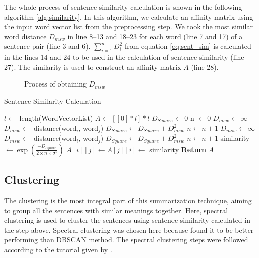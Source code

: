The whole process of sentence similarity calculation is shown in the following algorithm \ref{alg:similarity}. In this algorithm, we calculate an affinity matrix using the input word vector list from the preprocessing step. We took the most similar word distance $D_{msw}$ in line 8--13 and 18--23 for each word (line 7 and 17) of a sentence pair (line 3 and 6). $\sum^n_{i=1}D_i^2$ from equation \ref{eq:sent_sim} is calculated in the lines 14 and 24 to be used in the calculation of sentence similarity (line 27). The similarity is used to construct an affinity matrix $A$ (line 28).
\begin{figure}
    \centering
    
    \caption{Process of obtaining $D_{msw}$}
    \label{fig:msd}
\end{figure}
\begin{algorithm} \caption{Sentence Similarity Calculation} \label{alg:similarity}
\begin{algorithmic}[1]
    \State $l \gets$ length(WordVectorList)
    \State $A \gets [ [ 0 ] * l ] * l$
        \State $D_{Square} \gets 0$
        \State n $\gets 0$
                \State $D_{msw} \gets \infty$
                        \State $D_{msw} \gets$ distance(word$_i$, word$_j$)
                    \EndIf
                \EndFor
                \State $D_{Square} \gets D_{Square} + D_{msw}^2$
                \State $n \gets n+1$ 
            \EndFor
                \State $D_{msw} \gets \infty$
                        \State $D_{msw} \gets$ distance(word$_i$, word$_j$)
                    \EndIf
                \EndFor
                \State $D_{Square} \gets D_{Square} + D_{msw}^2$
                \State $n \gets n+1$
            \EndFor
            \State similarity $\gets \exp \left( \frac{- D_{Square}}{2 \times n \times \sigma^2} \right)$
            \State $A[i][j] \gets A[j][i] \gets$ similarity
        \EndFor
    \EndFor
    \State \textbf{Return} $A$
\end{algorithmic}
\end{algorithm}

\subsection{Clustering}\label{subsec:clustering}
The clustering is the most integral part of this summarization technique, aiming to group all the sentences with similar meanings together. Here, spectral clustering is used to cluster the sentences using sentence similarity calculated in the step above. Spectral clustering was chosen here because \citeauthor{roychowdhury-etal-2022-spectral-base} \cite{roychowdhury-etal-2022-spectral-base} found it to be better performing than DBSCAN method. The spectral clustering steps were followed according to the tutorial given by \cite{vonLuxburg-2007-spectral-tutorial}. \\

